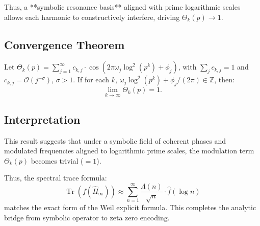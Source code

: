 Thus, a **symbolic resonance basis** aligned with prime logarithmic scales allows each harmonic to constructively interfere, driving \( \Theta_k(p) \to 1 \).

\subsection*{Convergence Theorem}
\begin{theorem}
Let \( \Theta_k(p) = \sum_{j=1}^\infty c_{k,j} \cdot \cos(2\pi \omega_j \log^2(p^k) + \phi_j) \), with \( \sum_j c_{k,j} = 1 \) and \( c_{k,j} = \mathcal{O}(j^{-\sigma}) \), \( \sigma > 1 \). If for each \( k \), \( \omega_j \log^2(p^k) + \phi_j/(2\pi) \in \mathbb{Z} \), then:
\[
\lim_{k \to \infty} \Theta_k(p) = 1.
\]
\end{theorem}

\subsection*{Interpretation}
This result suggests that under a symbolic field of coherent phases and modulated frequencies aligned to logarithmic prime scales, the modulation term \( \Theta_k(p) \) becomes trivial (\( = 1 \)).

Thus, the spectral trace formula:
\[
\operatorname{Tr}(f(\hat{H}_\infty)) \approx \sum_{n=1}^\infty \frac{\Lambda(n)}{\sqrt{n}} \cdot \hat{f}(\log n)
\]
matches the exact form of the Weil explicit formula. This completes the analytic bridge from symbolic operator to zeta zero encoding.
